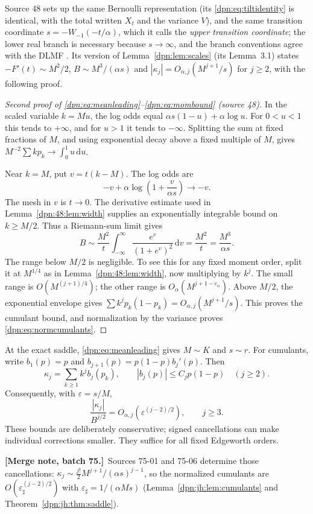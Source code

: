 \documentclass[11pt]{article}
\numberwithin{equation}{section}
\theoremstyle{definition}\newtheorem{definition}[theorem]{Definition}
\theoremstyle{remark}\newtheorem{remark}[theorem]{Remark}
\newcommand{\dd}{\,\mathrm d}\newcommand{\ii}{\mathrm i}
\newcommand{\eps}{\varepsilon}
\newcommand{\src}[1]{\textup{(source #1)}}
\newcommand{\mergenoteb}[1]{\par\smallskip\noindent\textbf{[Merge note, batch 75.]}\ #1\par\smallskip}
\newcommand{\epsh}{\varepsilon_{\sharp}}
\begin{document}
Source 48 sets up the same Bernoulli representation (its
\eqref{dpn:eq:tiltidentity} is identical, with the total written $X_t$ and the
variance $V$), and the same transition coordinate $s=-W_{-1}(-t/\alpha)$, which
it calls the \emph{upper transition coordinate}; the lower real branch is
necessary because $s\to\infty$, and the branch conventions agree with the
DLMF \cite{DLMFW}.  Its version of Lemma~\ref{dpn:lem:scales} (its
Lemma~3.1) states $-F'(t)\sim M^2/2$, $B\sim M^3/(\alpha s)$ and
$|\kappa_j|=O_{\alpha,j}(M^{j+1}/s)$ for $j\ge2$, with the following proof.

\begin{proof}[Second proof of \eqref{dpn:eq:meanleading}--\eqref{dpn:eq:mombound} \src{48}]
In the scaled variable $k=Mu$, the log odds equal $\alpha s(1-u)+\alpha\log u$.
For $0<u<1$ this tends to $+\infty$, and for $u>1$ it tends to $-\infty$.
Splitting the sum at fixed fractions of $M$, and using exponential decay above
a fixed multiple of $M$, gives $M^{-2}\sum kp_k\to\int_0^1u\dd u$.

Near $k=M$, put $v=t(k-M)$. The log odds are
\[
 -v+\alpha\log\left(1+\frac{v}{\alpha s}\right)\longrightarrow-v.
\]
The mesh in $v$ is $t\to0$. The derivative estimate used in
Lemma~\ref{dpn:48:lem:width} supplies an exponentially integrable bound on
$k\ge M/2$. Thus a Riemann-sum limit gives
\[
 B\sim\frac{M^2}{t}\int_{-\infty}^{\infty}
                 \frac{e^v}{(1+e^v)^2}\dd v
       =\frac{M^2}{t}=\frac{M^3}{\alpha s}.
\]
The range below $M/2$ is negligible. To see this for any fixed moment order,
split it at $M^{1/4}$ as in Lemma~\ref{dpn:48:lem:width}, now multiplying by
$k^j$. The small range is $O(M^{(j+1)/4})$; the other range is
$O_\alpha(M^{j+1-c_\alpha})$. Above $M/2$, the exponential envelope gives
$\sum k^jp_k(1-p_k)=O_{\alpha,j}(M^{j+1}/s)$. This proves the cumulant bound,
and normalization by the variance proves \eqref{dpn:eq:normcumulants}.
\end{proof}

At the exact saddle, \eqref{dpn:eq:meanleading} gives $M\sim K$ and $s\sim r$.
For cumulants, write $b_1(p)=p$ and
$b_{j+1}(p)=p(1-p)b_j'(p)$. Then
\begin{equation}\label{dpn:eq:cumulants}
 \kappa_j=\sum_{k\ge1}k^j b_j(p_k),\qquad
 |b_j(p)|\le C_jp(1-p)\quad(j\ge2).
\end{equation}
Consequently, with $\eps=s/M$,
\begin{equation}\label{dpn:eq:normcumulants}
 \frac{|\kappa_j|}{B^{j/2}}
      =O_{\alpha,j}(\eps^{(j-2)/2}),\qquad j\ge3.
\end{equation}
These bounds are deliberately conservative; signed cancellations can make
individual corrections smaller. They suffice for all fixed Edgeworth orders.
\mergenoteb{Sources 75-01 and 75-06 determine those cancellations:
$\kappa_j\sim\frac{j!}2M^{j+1}/(\alpha s)^{j-1}$, so the normalized cumulants
are $O(\epsh^{(j-2)/2})$ with $\epsh=1/(\alpha Ms)$
(Lemma~\ref{dpn:jh:lem:cumulants} and Theorem~\ref{dpn:jh:thm:saddle}).}
\end{document}
